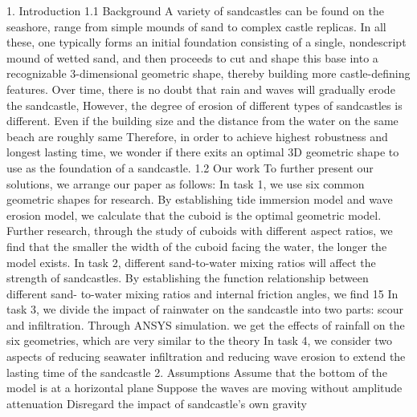 1. Introduction
1.1 Background
A variety of sandcastles can be found on the seashore, range from simple mounds
of sand to complex castle replicas. In all these, one typically forms an initial foundation
consisting of a single, nondescript mound of wetted sand, and then proceeds to cut and
shape this base into a recognizable 3-dimensional geometric shape, thereby building
more castle-defining features.
Over time, there is no doubt that rain and waves will gradually erode the sandcastle,
However, the degree of erosion of different types of sandcastles is different. Even if the
building size and the distance from the water on the same beach are roughly same
Therefore, in order to achieve highest robustness and longest lasting time, we
wonder if there exits an optimal 3D geometric shape to use as the foundation of a
sandcastle.
1.2 Our work
To further present our solutions, we arrange our paper as follows:
In task 1, we use six common geometric shapes for research. By establishing
tide immersion model and wave erosion model, we calculate that the cuboid is
the optimal geometric model. Further research, through the study of cuboids
with different aspect ratios, we find that the smaller the width of the cuboid
facing the water, the longer the model exists.
In task 2, different sand-to-water mixing ratios will affect the strength of
sandcastles. By establishing the function relationship between different sand-
to-water mixing ratios and internal friction angles, we find 15%
In task 3, we divide the impact of rainwater on the sandcastle into two parts:
scour and infiltration. Through ANSYS simulation. we get the effects of
rainfall on the six geometries, which are very similar to the theory
In task 4, we consider two aspects of reducing seawater infiltration and
reducing wave erosion to extend the lasting time of the sandcastle
2. Assumptions
Assume that the bottom of the model is at a horizontal plane
Suppose the waves are moving without amplitude attenuation
Disregard the impact of sandcastle's own gravity